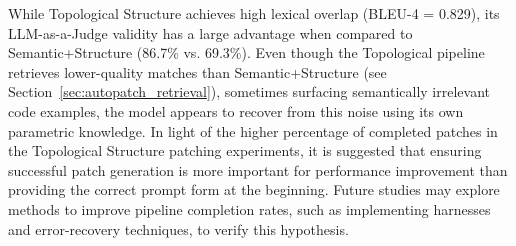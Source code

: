 While Topological Structure achieves high lexical overlap (BLEU-4 = 0.829), its LLM-as-a-Judge validity has a large advantage when compared to Semantic+Structure (86.7\% vs. 69.3\%). 
Even though the Topological pipeline retrieves lower-quality matches than Semantic+Structure (see Section~\ref{sec:autopatch_retrieval}), sometimes surfacing semantically irrelevant code examples, the model appears to recover from this noise using its own parametric knowledge. 
In light of the higher percentage of completed patches in the Topological Structure patching experiments, it is suggested that ensuring successful patch generation is more important for performance improvement than providing the correct prompt form at the beginning. Future studies may explore methods to improve pipeline completion rates, such as implementing harnesses and error-recovery techniques, to verify this hypothesis.



